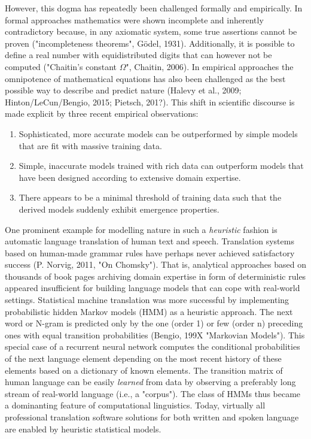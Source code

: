 \documentclass[authoryear,review,3p]{elsarticle}
\begin{document}
However, this dogma has repeatedly been challenged formally
and empirically.
%
In formal approaches
mathematics were shown incomplete and inherently contradictory because,
in any axiomatic system, some true assertions cannot be proven
("incompleteness theorems", G\"odel, 1931).
Additionally,
it is possible to define a real number with equidistributed
digits that can however not be computed
("Chaitin's constant $\Omega$", Chaitin, 2006).
%
In empirical approaches
the omnipotence of mathematical equations has also been challenged
as the
best possible way to describe and predict nature
(Halevy et al., 2009; Hinton/LeCun/Bengio, 2015; Pietsch, 201?).
%
This shift in scientific discourse is made explicit by
three recent empirical observations:
\begin{enumerate}
  \item Sophisticated, more accurate models can be outperformed by
  simple models that are fit with massive training data.
  \item Simple, inaccurate models trained with rich data can outperform
  models that have been designed according to
  extensive domain expertise.
  \item There appears to be a minimal threshold of training data
  such that the derived models suddenly exhibit emergence properties.
\end{enumerate}

One prominent example for modelling nature in such a \textit{heuristic} fashion is
automatic language translation of human text and speech.
Translation systems based on 
human-made grammar rules have perhaps never achieved
satisfactory success (P. Norvig, 2011, "On Chomsky").
That is, analytical approaches based on
thousands of book pages archiving domain expertise in form of
deterministic rules appeared insufficient for building
language models that can cope with real-world settings.
%
Statistical machine translation was more successful
by implementing probabilistic hidden Markov models (HMM)
as a heuristic approach.
%
The next word or N-gram is predicted
only by the one (order 1) or few (order n) preceding ones
with equal transition probabilities (Bengio, 199X "Markovian Models").
This special case of a recurrent neural network
computes the conditional probabilities of the next language element
depending on the most recent history of these elements
based on a dictionary of known elements.
The transition matrix of human language can be easily \textit{learned}
from data by observing a preferably long stream of
real-world language (i.e., a "corpus").
%
The class of HMMs
thus became a dominanting feature
of computational linguistics.
%
Today, virtually all professional translation software solutions
for both written and spoken language
are enabled by heuristic statistical models.
\end{document}
